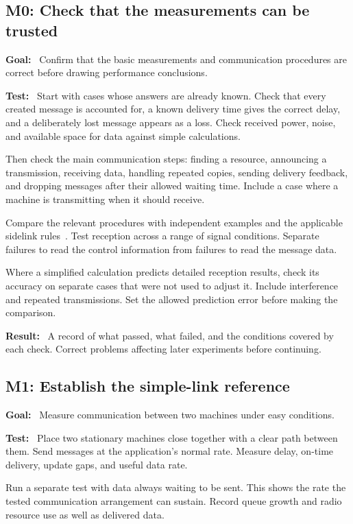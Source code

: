 \documentclass[11pt,a4paper]{article}
\newcommand{\field}[1]{\textbf{#1:}~}
\begin{document}
\subsection{M0: Check that the measurements can be trusted}

\field{Goal} Confirm that the basic measurements and communication procedures
are correct before drawing performance conclusions.

\field{Test} Start with cases whose answers are already known. Check that
every created message is accounted for, a known delivery time gives the
correct delay, and a deliberately lost message appears as a loss. Check
received power, noise, and available space for data against simple calculations.

Then check the main communication steps: finding a resource, announcing a
transmission, receiving data, handling repeated copies, sending delivery
feedback, and dropping messages after their allowed waiting time.
Include a case where a machine is transmitting when it should receive.

Compare the relevant procedures with independent examples and the applicable
sidelink rules~\cite{ts38214}. Test reception across a range of signal
conditions. Separate failures to read the control information from failures
to read the message data.

Where a simplified calculation predicts detailed reception results, check
its accuracy on separate cases that were not used to adjust it. Include
interference and repeated transmissions. Set the allowed prediction error
before making the comparison.

\field{Result} A record of what passed, what failed, and the conditions covered
by each check. Correct problems affecting later experiments before continuing.

\subsection{M1: Establish the simple-link reference}

\field{Goal} Measure communication between two machines under easy conditions.

\field{Test} Place two stationary machines close together with a clear path
between them. Send messages at the application's normal rate. Measure delay,
on-time delivery, update gaps, and useful data rate.

Run a separate test with data always waiting to be sent. This shows the
rate the tested communication arrangement can sustain. Record queue growth
and radio resource use as well as delivered data.
\end{document}
